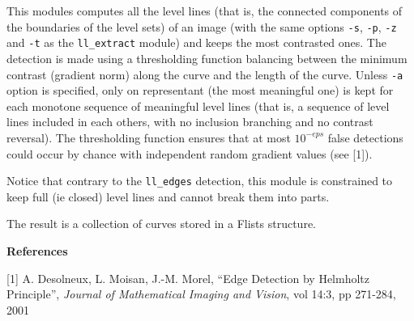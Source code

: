 This modules computes all the level lines (that is, the connected
components of the boundaries of the level sets) of an image 
(with the same options \verb+-s+, \verb+-p+, \verb+-z+ and \verb+-t+ 
as the \verb+ll_extract+ module) and keeps the most contrasted ones.
The detection is made using a thresholding function balancing between 
the minimum contrast (gradient norm) along the curve and the
length of the curve. Unless \verb+-a+ option is specified, only
on representant (the most meaningful one) is kept for each 
monotone sequence of meaningful level lines (that is, a sequence
of level lines included in each others, with no inclusion
branching and no contrast reversal).
The thresholding function ensures
that at most $10^{-eps}$ false detections could occur by chance
with independent random gradient values (see [1]).

\medskip

Notice that contrary to the \verb+ll_edges+ detection, this 
module is constrained to keep full (ie closed) level lines and 
cannot break them into parts.

\medskip

The result is a collection of curves stored in a Flists structure.

\bigskip

{\large \bf References}

\medskip

[1] A. Desolneux, L. Moisan, J.-M. Morel, ``Edge Detection by Helmholtz 
Principle'', {\it Journal of Mathematical Imaging and Vision}, 
vol 14:3, pp 271-284, 2001
